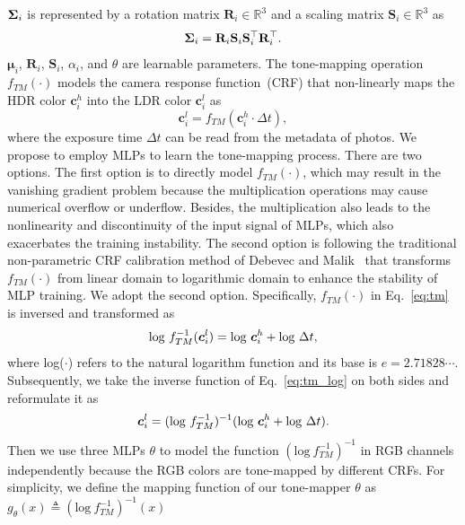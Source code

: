 \documentclass{article}
\begin{document}
$\mathrm{\bf \Sigma}_i$ is represented by a rotation matrix $\mathbf{R}_i \in \mathbb{R}^3$ and a scaling matrix $\mathbf{S}_i \in \mathbb{R}^3$ as 
\begin{equation}
    \mathrm{\bf \Sigma}_i = \mathbf{R}_i \mathbf{S}_i \mathbf{S}_i^\top \mathbf{R}_i^\top. 
\end{equation}
$\bm{\mu}_i$, $\mathbf{R}_i$, $\mathbf{S}_i$, $\alpha_i$, and $\theta$ are learnable parameters. The tone-mapping operation {\small$f_{TM}(\cdot)$} models the camera response function~(CRF) that non-linearly maps the HDR color $\bm{c}_i^h$ into the LDR color $\bm{c}_i^l$ as
\begin{equation}
    \bm{c}_i^l = f_{TM} (\bm{c}_i^h \cdot \Delta t),
    \label{eq:tm}
\end{equation}
where the exposure time $\Delta t$ can be read from the metadata of photos. We propose to employ MLPs to learn the tone-mapping process. There are two options. The first option is to directly model {\small $f_{TM}(\cdot)$}, which may result in the vanishing gradient problem because the multiplication operations may cause numerical overflow or underflow. Besides, the multiplication also leads to the nonlinearity and discontinuity of the input signal of MLPs, which also exacerbates the training instability. The second option is following the traditional non-parametric CRF calibration method of Debevec and Malik~\cite{malik} that transforms {\small$f_{TM}(\cdot)$} from linear domain to logarithmic domain to enhance the stability of MLP training. We adopt the second option. Specifically, {\small $f_{TM}(\cdot)$} in Eq.~\eqref{eq:tm} is inversed and transformed as
\vspace{0.2mm}
\begin{equation}
    \text{log}~f_{TM}^{-1} (\bm{c}_i^l) = \text{log}~\bm{c}_i^h + \text{log}~\Delta t,
    \label{eq:tm_log}
\vspace{0.2mm}
\end{equation}
where log($\cdot$) refers to the natural logarithm function and its base is $e = 2.71828\cdots$. Subsequently, we take the inverse function of Eq.~\eqref{eq:tm_log} on both sides and reformulate it as
\vspace{0.3mm}
\begin{equation}
    \bm{c}_i^l = (\text{log}~f_{TM}^{-1})^{-1}(\text{log}~\bm{c}_i^h + \text{log}~\Delta t).
    \label{eq:tm_3}
\vspace{0.3mm}
\end{equation}
Then we use three MLPs $\theta$ to model the function {\small$(\text{log}~f_{TM}^{-1})^{-1}$} in RGB channels independently because the RGB colors are tone-mapped by different CRFs. For simplicity, we define the mapping function of our tone-mapper $\theta$ as {\small $g_{\theta}(x) \triangleq (\text{log}~f_{TM}^{-1})^{-1}(x)$}
\end{document}
